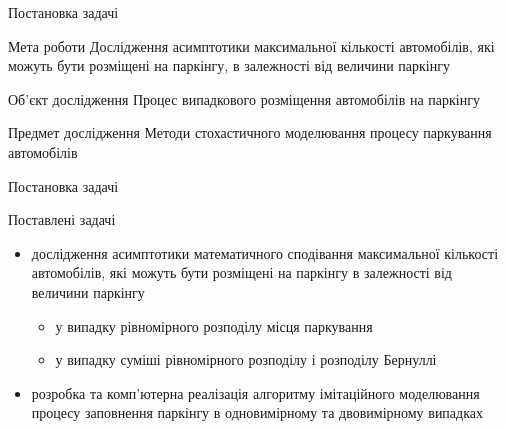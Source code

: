 \begin{frame}{Постановка задачі}
	\manimate
	\vspace{-8pt}
	\begin{block}{Мета роботи}
		 Дослідження асимптотики максимальної кількості автомобілів, які можуть бути розміщені на паркінгу, в залежності від величини паркінгу
	\end{block} 

	\begin{block}{Об'єкт дослідження}
		Процес випадкового розміщення автомобілів на паркінгу
	\end{block}
	
	\begin{block}{Предмет дослідження}
		Методи стохастичного моделювання процесу паркування автомобілів
	\end{block}
\end{frame}

\begin{frame}{Постановка задачі}
	\manimate
	\vspace{-8pt}
		\begin{block}{Поставлені задачі}
			\begin{itemize}
				\item дослідження асимптотики математичного сподівання максимальної кількості автомобілів, які можуть бути розміщені на паркінгу в залежності від величини паркінгу
				\begin{itemize}
					\item у випадку рівномірного розподілу місця паркування
					\item у випадку суміші рівномірного розподілу і розподілу Бернуллі
				\end{itemize}
				\item розробка та комп'ютерна реалізація алгоритму імітаційного моделювання процесу заповнення паркінгу в одновимірному та двовимірному випадках
			\end{itemize}
		\end{block}
\end{frame}

